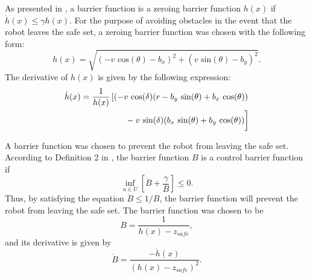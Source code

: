 \documentclass[conference]{IEEEtran}
\begin{document}
As presented in \cite{ames2015robust}, a barrier function is a zeroing barrier function $h(x)$ if $\dot{h}(x)\leq \gamma h(x).$ For the purpose of avoiding obstacles in the event that the robot leaves the safe set, a zeroing barrier function was chosen with the following form:
\begin{equation}
h(x)=\sqrt{(-v\text{ cos}(\theta)-b_x)^2+(v\text{ sin}(\theta)-b_y)^2}.
\end{equation}
The derivative of $h(x)$ is given by the following expression:
\begin{equation}
\begin{split}
\dot{h}(x)=\frac{1}{h(x)} \left[ (-v\text{ cos}(\delta)(r-b_y\text{ sin}(\theta)+b_x\text{ cos}(\theta)) \right. \\
\left. \vphantom{\frac{1}{h(x)}}-v\text{ sin}(\delta)(b_x\text{ sin}(\theta)+b_y\text{ cos}(\theta))\right]
\end{split}
\label{zbf}
\end{equation}

A barrier function was chosen to prevent the robot from leaving the safe set. According to Definition 2 in \cite{amesACC}, the barrier function $B$ is a control barrier function if 
\begin{equation}
\inf_{u\in U}\left[ \dot{B}+\frac{\gamma}{B} \right] \leq 0.
\label{eq:cbf}
\end{equation} Thus, by satisfying the equation $\dot{B}\leq 1/B$, the barrier function will prevent the robot from leaving the safe set. The barrier function was chosen to be
\begin{equation}
B=\frac{1}{h(x)-z_{safe}},
\label{bf}
\end{equation}
and its derivative is given by
\begin{equation}
\dot{B}=\frac{-\dot{h}(x)}{(h(x)-z_{safe})^2}.
\end{equation}

\end{document}
